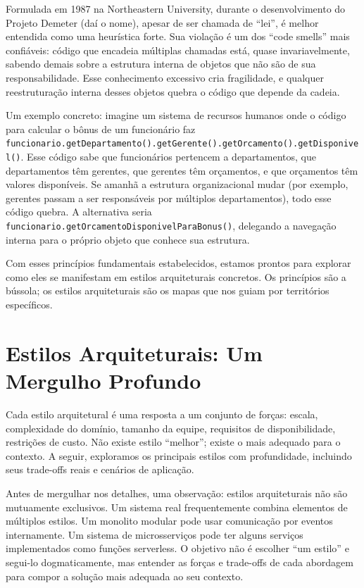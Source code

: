 Formulada em 1987 na Northeastern University, durante o
desenvolvimento do Projeto Demeter (daí o nome), apesar de ser chamada de
``lei'', é melhor entendida como uma heurística forte. Sua violação é um dos
``code smells'' mais confiáveis: código que encadeia múltiplas chamadas está,
quase invariavelmente, sabendo demais sobre a estrutura interna de objetos que
não são de sua responsabilidade. Esse conhecimento excessivo cria fragilidade,
e qualquer reestruturação interna desses objetos quebra o código que depende
da cadeia.

Um exemplo concreto: imagine um sistema de recursos humanos onde o código para
calcular o bônus de um funcionário faz
\texttt{funcionario.getDepartamento().getGerente().getOrcamento().getDisponivel()}.
Esse código sabe que funcionários pertencem a departamentos, que departamentos
têm gerentes, que gerentes têm orçamentos, e que orçamentos têm valores
disponíveis. Se amanhã a estrutura organizacional mudar (por exemplo, gerentes
passam a ser responsáveis por múltiplos departamentos), todo esse código quebra.
A alternativa seria \texttt{funcionario.getOrcamentoDisponivelParaBonus()},
delegando a navegação interna para o próprio objeto que conhece sua estrutura.

Com esses princípios fundamentais estabelecidos, estamos prontos para explorar
como eles se manifestam em estilos arquiteturais concretos. Os princípios são a
bússola; os estilos arquiteturais são os mapas que nos guiam por territórios
específicos.


\section{Estilos Arquiteturais: Um Mergulho Profundo}

Cada estilo arquitetural é uma resposta a um conjunto de forças: escala, complexidade
do domínio, tamanho da equipe, requisitos de disponibilidade, restrições de custo.
Não existe estilo ``melhor''; existe o mais adequado para o contexto. A seguir,
exploramos os principais estilos com profundidade, incluindo seus trade-offs reais
e cenários de aplicação.

Antes de mergulhar nos detalhes, uma observação: estilos
arquiteturais não são mutuamente exclusivos. Um sistema real frequentemente
combina elementos de múltiplos estilos. Um monolito modular pode usar comunicação
por eventos internamente. Um sistema de microsserviços pode ter alguns serviços
implementados como funções serverless. O objetivo não é escolher ``um estilo'' e
segui-lo dogmaticamente, mas entender as forças e trade-offs de cada abordagem
para compor a solução mais adequada ao seu contexto.

